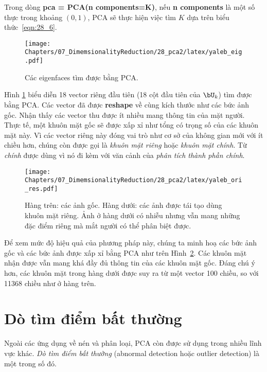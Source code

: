 Trong dòng \textbf{pca = PCA(n components=K)}, nếu
\textbf{n components} là một số thực trong khoảng $(0, 1)$, PCA sẽ thực
hiện việc tìm $K$ dựa trên biểu thức~\eqref{eqn:28_6}.

\begin{figure}[t]
	\centering
	\texttt{[image: Chapters/07\_DimemsionalityReduction/28\_pca2/latex/yaleb\_eig.pdf]}
	\caption{Các eigenfaces tìm được bằng PCA.}
	\label{fig:28_2}
\end{figure}

Hình \ref{fig:28_2} biểu diễn 18 vector riêng đầu tiên (18 cột đầu tiên của $\bU_k$) tìm được bằng PCA. Các vector đã được \textbf{reshape} về cùng
kích thước như các bức ảnh gốc. Nhận thấy các
vector thu được ít nhiều mang thông tin của mặt người. Thực tế, một khuôn mặt
gốc sẽ được xấp xỉ như tổng có trọng số của các {khuôn mặt} này. Vì các
vector riêng này đóng vai trò như cơ sở của không gian mới với ít chiều hơn,
chúng còn được gọi là \textit{khuôn mặt riêng} hoặc \textit{khuôn mặt chính}. Từ \textit{chính} được dùng vì nó đi kèm với văn cảnh
của \textit{phân tích thành phần chính}.
\begin{figure}[t]
	\centering
	\texttt{[image: Chapters/07\_DimemsionalityReduction/28\_pca2/latex/yaleb\_ori\_res.pdf]}
	\caption{Hàng trên: các ảnh gốc. Hàng dưới: các ảnh được tái tạo dùng khuôn mặt riêng. Ảnh ở hàng dưới có nhiễu nhưng vẫn mang những đặc điểm riêng mà mắt người có thể phân biệt được.}
	\label{fig:28_3}
\end{figure}

Để xem mức độ hiệu quả của phương pháp này, chúng ta  minh hoạ các bức ảnh gốc và các bức ảnh được xấp xỉ bằng PCA như trên
Hình~\ref{fig:28_3}. Các khuôn mặt nhận được vẫn mang khá đầy đủ thông tin của
các khuôn mặt gốc. Đáng chú ý hơn, các khuôn mặt trong hàng dưới được suy ra
từ một vector 100 chiều, so với 11368 chiều như ở hàng trên.
\section{Dò tìm điểm bất thường}
Ngoài các ứng dụng về nén và phân loại, PCA còn được sử dụng trong nhiều lĩnh
vực khác. \textit{Dò tìm điểm bất thường} (abnormal detection hoặc {outlier
	detection}) là một trong số đó. 

